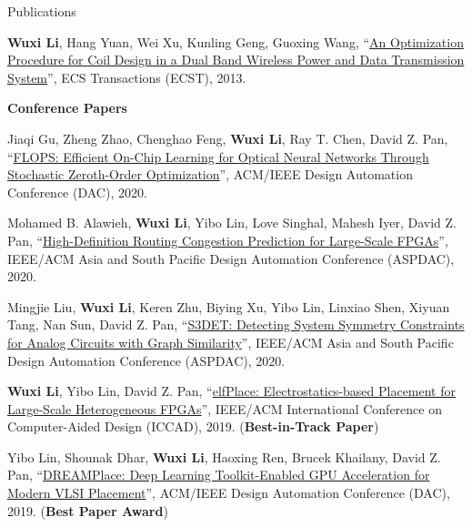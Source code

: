 \begin{rSection}{Publications}
\begin{description}[font=\normalfont]
\item[{[J1]}]{
    \textbf{Wuxi Li}, Hang Yuan, Wei Xu, Kunling Geng, Guoxing Wang,
    ``\href{http://ecst.ecsdl.org/content/52/1/1091.short}{An Optimization Procedure for Coil Design in a Dual Band Wireless Power and Data Transmission System}'',
    ECS Transactions (ECST), 2013.
}

\end{description}

\textbf{Conference Papers}
\begin{description}[font=\normalfont]
\item[{[C11]}]{
    Jiaqi Gu, Zheng Zhao, Chenghao Feng, \textbf{Wuxi Li}, Ray T. Chen, David Z. Pan,
    ``\href{https://ieeexplore.ieee.org/document/9218593}{FLOPS: Efficient On-Chip Learning for Optical Neural Networks Through Stochastic Zeroth-Order Optimization}'',
    ACM/IEEE Design Automation Conference (DAC), 2020.
}

\item[{[C10]}]{
    Mohamed B. Alawieh, \textbf{Wuxi Li}, Yibo Lin, Love Singhal, Mahesh Iyer, David Z. Pan,
    ``\href{https://ieeexplore.ieee.org/document/9045178}{High-Definition Routing Congestion Prediction for Large-Scale FPGAs}'',
    IEEE/ACM Asia and South Pacific Design Automation Conference (ASPDAC), 2020.
}

\item[{[C9]}]{
    Mingjie Liu, \textbf{Wuxi Li}, Keren Zhu, Biying Xu, Yibo Lin, Linxiao Shen, Xiyuan Tang, Nan Sun, David Z. Pan,
    ``\href{https://ieeexplore.ieee.org/document/9045109}{S3DET: Detecting System Symmetry Constraints for Analog Circuits with Graph Similarity}'',
    IEEE/ACM Asia and South Pacific Design Automation Conference (ASPDAC), 2020.
}

\item[{[C8]}]{
    \textbf{Wuxi Li}, Yibo Lin, David Z. Pan,
    ``\href{https://ieeexplore.ieee.org/document/8942075}{elfPlace: Electrostatics-based Placement for Large-Scale Heterogeneous FPGAs}'',
    IEEE/ACM International Conference on Computer-Aided Design (ICCAD), 2019.
    (\textbf{Best-in-Track Paper})
}

\item[{[C7]}]{
    Yibo Lin, Shounak Dhar, \textbf{Wuxi Li}, Haoxing Ren, Brucek Khailany, David Z. Pan,
    ``\href{https://dl.acm.org/citation.cfm?id=3317803}{DREAMPlace: Deep Learning Toolkit-Enabled GPU Acceleration for Modern VLSI Placement}'',
    ACM/IEEE Design Automation Conference (DAC), 2019.
    (\textbf{Best Paper Award})
}


\end{description}
\end{rSection}
